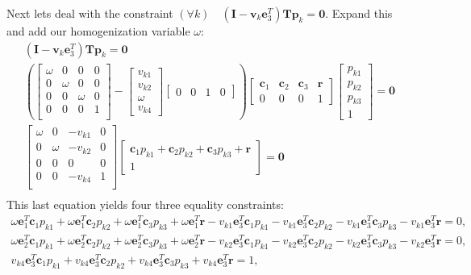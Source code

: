 \documentclass{article}
\newcommand{\mbf}[1]{\mathbf{#1}}
\newcommand{\bbm}{\begin{bmatrix}}
\newcommand{\ebm}{\end{bmatrix}}
\begin{document}
Next lets deal with the constraint $(\forall k) \quad (\mbf{I} - \mbf{v}_k \mbf{e}_3^T) \mbf{T} \mbf{p}_k = \mbf{0}$. Expand this and add our homogenization variable $\omega$:
\begin{align}
    (\mbf{I} - \mbf{v}_k \mbf{e}_3^T) \mbf{T} \mbf{p}_k = \mbf{0} \\
    \left( \bbm
        \omega & 0 & 0 & 0 \\
        0 & \omega & 0 & 0 \\
        0 & 0 & \omega & 0 \\ 
        0 & 0 & 0 & 1 \\
    \ebm - \bbm
        v_{k1} \\
        v_{k2} \\
        \omega \\
        v_{k4} 
    \ebm \bbm
        0 & 0 & 1 & 0
    \ebm \right) \bbm
        \mbf{c}_1 & \mbf{c}_2 & \mbf{c}_3 & \mbf{r} \\
        0 & 0 & 0 & 1
    \ebm \bbm
        p_{k1} \\
        p_{k2} \\
        p_{k3} \\
        1
    \ebm = \mbf{0} \\
    \bbm
        \omega & 0 & -v_{k1} & 0 \\
        0 & \omega & -v_{k2} & 0 \\
        0 & 0 & 0 & 0 \\
        0 & 0 & -v_{k4} & 1 \\
    \ebm \bbm
        \mbf{c}_1 p_{k1} + \mbf{c}_2 p_{k2} + \mbf{c}_3 p_{k3} + \mbf{r} \\
        1
    \ebm = \mbf{0} \\
\end{align}
This last equation yields four three equality constraints:
{\small
\begin{align}
    \omega \mbf{e}_1^T \mbf{c}_1 p_{k1}
    + \omega \mbf{e}_1^T \mbf{c}_2 p_{k2}
    + \omega \mbf{e}_1^T \mbf{c}_3 p_{k3}
    + \omega \mbf{e}_1^T \mbf{r}
    - v_{k1}\mbf{e}_3^T  \mbf{c}_1 p_{k1}
    - v_{k1}\mbf{e}_3^T \mbf{c}_2 p_{k2}
    - v_{k1}\mbf{e}_3^T \mbf{c}_3 p_{k3}
    - v_{k1}\mbf{e}_3^T \mbf{r} = 0, \\
    \omega \mbf{e}_2^T \mbf{c}_1 p_{k1}
    + \omega \mbf{e}_2^T \mbf{c}_2 p_{k2}
    + \omega \mbf{e}_2^T \mbf{c}_3 p_{k3}
    + \omega \mbf{e}_2^T \mbf{r}
    - v_{k2}\mbf{e}_3^T  \mbf{c}_1 p_{k1}
    - v_{k2}\mbf{e}_3^T \mbf{c}_2 p_{k2}
    - v_{k2}\mbf{e}_3^T \mbf{c}_3 p_{k3}
    - v_{k2}\mbf{e}_3^T \mbf{r} = 0, \\
    v_{k4}\mbf{e}_3^T  \mbf{c}_1 p_{k1}
    + v_{k4}\mbf{e}_3^T \mbf{c}_2 p_{k2}
    + v_{k4}\mbf{e}_3^T \mbf{c}_3 p_{k3}
    + v_{k4}\mbf{e}_3^T \mbf{r} = 1, \\
\end{align}
}
\end{document}
